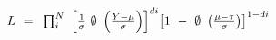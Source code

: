 $L{\rm{\ }} = {\rm{\ }}\prod _i^N{\rm{\ }}{{\left[ {\frac{1}{\sigma }{\rm{\ }}\emptyset {\rm{\ }}\left( {\frac{{Y - \mu }}{\sigma }} \right)} \right]}^{di}}{{\left[ {1{\rm{\ }} - {\rm{\ }}\emptyset {\rm{\ }}\left( {\frac{{\mu  - \tau }}{\sigma }} \right)} \right]}^{1 - di}}$
